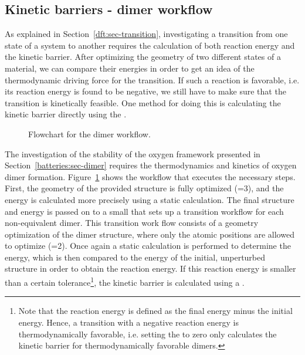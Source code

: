 \begin{refsection}
\subsection{Kinetic barriers - dimer workflow} 
 
As explained in Section~\ref{dft:sec-transition}, investigating a transition 
from one state of a system to another requires the calculation of both 
reaction energy and the kinetic barrier. After optimizing the geometry of two 
different states of a material, we can compare their energies in order to get 
an idea of the thermodynamic driving force for the transition. If such a 
reaction is favorable, i.e. its reaction energy is found to be negative, we 
still have to make sure that the transition is kinetically feasible. One 
method for doing this is calculating the kinetic barrier directly using the 
. 
 
\begin{figure}[ht!] 
\centering 
 
\caption{\label{automation:fig-dimer} Flowchart for the dimer workflow.} 
\end{figure} 
 
The investigation of the stability of the oxygen framework presented in 
Section~\ref{batteries:sec-dimer} requires the thermodynamics and kinetics of 
oxygen dimer formation. Figure~\ref{automation:fig-dimer} shows the workflow 
that executes the necessary steps. First, the geometry of the provided 
structure is fully optimized (=3), and the energy is calculated 
more precisely using a static calculation. The final structure and energy is 
passed on to a small  that sets up a transition workflow
for each non-equivalent dimer. This transition work flow consists of a 
geometry optimization of the dimer structure, where only the atomic positions 
are allowed to optimize (=2). \pagebreak Once again a static calculation is 
performed to determine the energy, which is then compared to the energy of the 
initial, unperturbed structure in order to obtain the reaction energy. If this 
reaction energy is smaller than a certain tolerance\footnote{Note that the reaction energy is defined as the final energy minus the initial energy. Hence, a transition with a negative reaction energy is thermodynamically favorable, i.e. setting the  to zero only calculates the kinetic barrier for thermodynamically favorable dimers.}, the kinetic barrier is 
calculated using a . 
 

\end{refsection}
